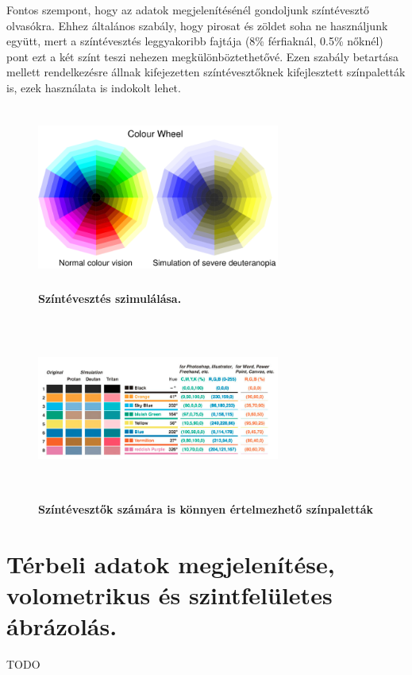 \documentclass[12pt]{article}
\theoremstyle{plain}
\begin{document}
 Fontos szempont, hogy az adatok megjelenítésénél gondoljunk  színtévesztő olvasókra. Ehhez általános szabály, hogy pirosat és zöldet soha ne használjunk együtt, mert a színtévesztés leggyakoribb fajtája (8\% férfiaknál, 0.5\% nőknél) pont ezt a két színt teszi nehezen megkülönböztethetővé. Ezen szabály betartása mellett rendelkezésre állnak kifejezetten színtévesztőknek kifejlesztett színpaletták is, ezek használata is indokolt lehet. 
 
 \begin{figure}[H]
    \centering
    \includegraphics[width=8cm, height=6cm]{media/cwheel-polar.png}
    \caption{\textbf{Színtévesztés szimulálása.}}
    \label{fig:GeneralDiagram}
 \end{figure}
 
 \begin{figure}[H]
    \centering
    \includegraphics[width=8cm, height=6cm]{media/colorb.png}
    \caption{\textbf{Színtévesztők számára is könnyen értelmezhető színpaletták}}
    \label{fig:GeneralDiagram}
 \end{figure}

 \section{Térbeli adatok megjelenítése, volometrikus és szintfelületes ábrázolás.}
 TODO
 
\end{document}
